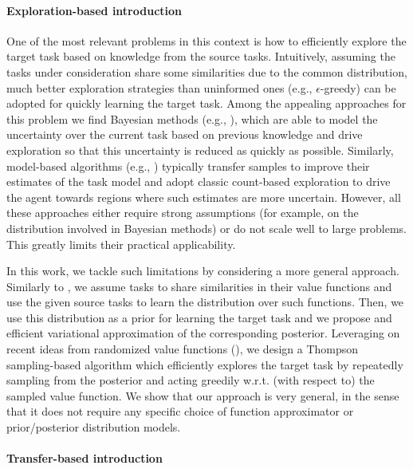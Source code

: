 \documentclass{article}
\begin{document}
\paragraph*{Exploration-based introduction}
One of the most relevant problems in this context is how to efficiently explore the target task based on knowledge from the source tasks. Intuitively, assuming the tasks under consideration share some similarities due to the common distribution, much better exploration strategies than uninformed ones (e.g., $\epsilon$-greedy) can be adopted for quickly learning the target task. Among the appealing approaches for this problem we find Bayesian methods (e.g., \cite{}), which are able to model the uncertainty over the current task based on previous knowledge and drive exploration so that this uncertainty is reduced as quickly as possible. Similarly, model-based algorithms (e.g., \cite{}) typically transfer samples to improve their estimates of the task model and adopt classic count-based exploration to drive the agent towards regions where such estimates are more uncertain. However, all these approaches either require strong assumptions (for example, on the distribution involved in Bayesian methods) or do not scale well to large problems. This greatly limits their practical applicability.

In this work, we tackle such limitations by considering a more general approach. Similarly to \cite{}, we assume tasks to share similarities in their value functions and use the given source tasks to learn the distribution over such functions. Then, we use this distribution as a prior for learning the target task and we propose and efficient variational approximation of the corresponding posterior. Leveraging on recent ideas from randomized value functions (\cite{}), we design a Thompson sampling-based algorithm which efficiently explores the target task by repeatedly sampling from the posterior and acting greedily w.r.t. (with respect to) the sampled value function. We show that our approach is very general, in the sense that it does not require any specific choice of function approximator or prior/posterior distribution models. 

\paragraph*{Transfer-based introduction}
\end{document}
